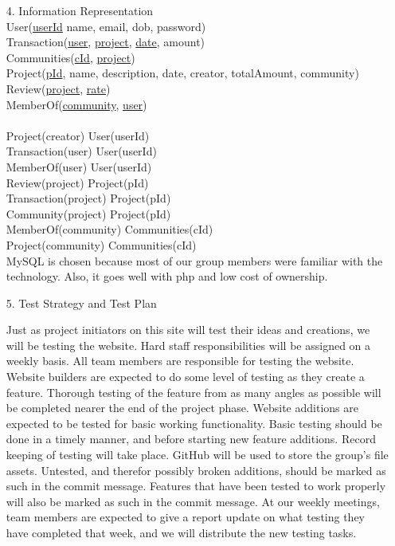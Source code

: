 \documentclass[12pt]{article}
\begin{document}
\begin{enumerate}
\item[4.] Information Representation\\
User(\underline{userId} name, email, dob, password)\\
Transaction(\underline{user}, \underline{project}, \underline{date}, amount)\\
Communities(\underline{cId}, \underline{project})\\
Project(\underline{pId}, name, description, date, creator, totalAmount, community)\\
Review(\underline{project}, \underline{rate})\\
MemberOf(\underline{community}, \underline{user})\\
\\
Project(creator) \subseteq User(userId)\\
Transaction(user) \subseteq User(userId)\\
MemberOf(user) \subseteq User(userId)\\
Review(project) \subseteq Project(pId)\\
Transaction(project) \subseteq Project(pId)\\
Community(project) \subseteq Project(pId)\\
MemberOf(community) \subseteq Communities(cId)\\
Project(community) \subseteq Communities(cId)\\

MySQL is chosen because most of our group members were familiar with the technology.
Also, it goes well with php and low cost of ownership.
 

\item[5.] Test Strategy and Test Plan

Just as project initiators on this site will test their ideas and creations, we will be testing the website. Hard staff responsibilities will be assigned on a weekly basis. All team members are responsible for testing the website. Website builders are expected to do some level of testing as they create a feature. Thorough testing of the feature from as many angles as possible will be completed nearer the end of the project phase. Website additions are expected to be tested for basic working functionality. Basic testing should be done in a timely manner, and before starting new feature additions. Record keeping of testing will take place. GitHub will be used to store the group’s file assets. Untested, and therefor possibly broken additions, should be marked as such in the commit message. Features that have been tested to work properly will also be marked as such in the commit message. At our weekly meetings, team members are expected to give a report update on what testing they have completed that week, and we will distribute the new testing tasks.


\end{enumerate}
\end{document}
